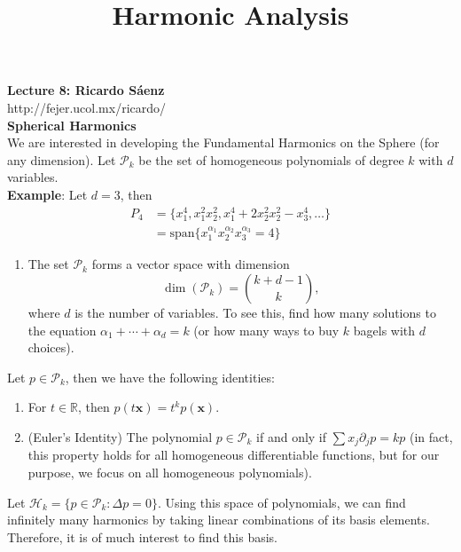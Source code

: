 \documentclass[12pt]{article}
\title{Harmonic Analysis}
\begin{document}
\noindent \textbf{Lecture 8: Ricardo S\'aenz} \\
\noindent http://fejer.ucol.mx/ricardo/ \\

\noindent \textbf{Spherical Harmonics} \\
\noindent We are interested in developing the Fundamental Harmonics on the Sphere (for any dimension). Let $\mathcal{P}_k$ be the set of homogeneous polynomials of degree $k$ with $d$ variables. \\

\textbf{Example}: Let $d=3$, then
\begin{align*} P_4 &= \{x_1^4,x_1^2x_2^2, x_1^4 + 2x_2^2x_2^2 - x_3^4, \dots \} \\
&= \text{span}\{x_1^{\alpha_1}x_2^{\alpha_2}x_3^{\alpha_3} = 4\}
\end{align*}

\begin{enumerate}[itemsep=0pt, topsep=0pt, parsep=0pt, partopsep=0pt]
\item The set $\mathcal{P}_k$ forms a vector space with dimension
$$\dim(\mathcal{P}_k) = \binom{k+d-1}{k},$$
where $d$ is the number of variables. To see this, find how many solutions to the equation $\alpha_1 + \cdots + \alpha_d = k$ (or how many ways to buy $k$ bagels with $d$ choices). \\ 
\end{enumerate}

\noindent Let $p \in \mathcal{P}_k$, then we have the following identities:\\
\begin{enumerate}[itemsep=0pt, topsep=0pt, parsep=0pt, partopsep=0pt]
\addtocounter{enumi}{1}
\item For $t \in \mathbb{R}$, then $p(t\textbf{x}) = t^kp(\textbf{x})$. \\
\item (Euler's Identity) The polynomial $p \in \mathcal{P}_k$ if and only if $\sum x_j \partial_j p = kp$ (in fact, this property holds for all homogeneous differentiable functions, but for our purpose, we focus on all homogeneous polynomials). \\
\end{enumerate}

\noindent Let $\mathcal{H}_k = \{p \in \mathcal{P}_k : \Delta p=0\}$. Using this space of polynomials, we can find infinitely many harmonics by taking linear combinations of its basis elements. Therefore, it is of much interest to find this basis. \\
\end{document}
